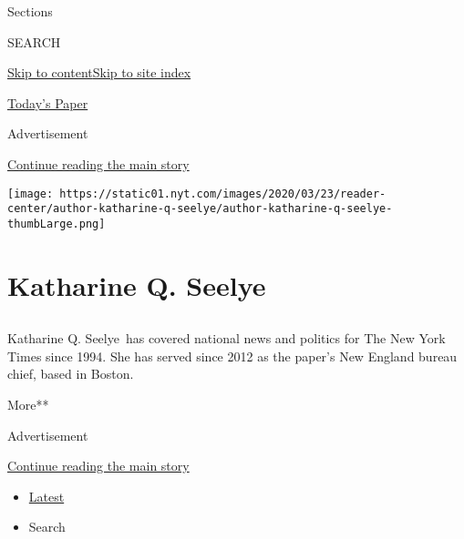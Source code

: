 Sections

SEARCH

\protect\hyperlink{site-content}{Skip to
content}\protect\hyperlink{site-index}{Skip to site index}

\href{https://myaccount.nytimes.com/auth/login?response_type=cookie\&client_id=vi}{}

\href{https://www.nytimes.com/section/todayspaper}{Today's Paper}

Advertisement

\protect\hyperlink{after-top}{Continue reading the main story}

\texttt{[image: https://static01.nyt.com/images/2020/03/23/reader-center/author-katharine-q-seelye/author-katharine-q-seelye-thumbLarge.png]}

\hypertarget{katharine-q-seelye}{%
\section{Katharine Q. Seelye}\label{katharine-q-seelye}}

\subsection{}

Katharine Q. Seelye~has covered national news and politics for The New
York Times since 1994. She has served since 2012 as the paper's New
England bureau chief, based in Boston.

More**

Advertisement

\protect\hyperlink{after-mid1}{Continue reading the main story}

\begin{itemize}
\tightlist
\item
  \protect\hyperlink{stream-panel}{Latest}
\item
  Search
\end{itemize}

